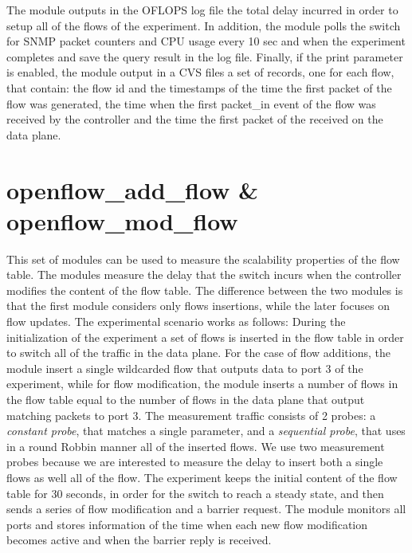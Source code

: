 \documentclass{book}
\begin{document}
  The module outputs in the OFLOPS log file the total delay incurred in order to
  setup all of the flows of the experiment. In addition, the module polls the 
  switch for SNMP packet counters and CPU usage every 10 sec and when the experiment 
  completes and save the query result in the log file. Finally, if the print 
  parameter is enabled, the module output in a CVS files a set of 
  records,  one for each flow, that contain: the flow id and the timestamps of the time the first
  packet of the flow was generated, the time when the first packet\_in event of
  the flow was received by the controller and the time the first packet of the
  received on the data plane. 

  \section{openflow\_add\_flow  \& openflow\_mod\_flow}

  This set of modules can be used to measure the scalability properties of the flow
  table. The modules measure the delay that the switch incurs when the controller
  modifies the content of the flow table. The difference between the two modules is that the first
  module considers only flows insertions, while the later focuses on flow updates.
  The experimental scenario works as follows: During the initialization of the
  experiment a set of flows is inserted in the flow table in order to switch all
  of the traffic in the data plane. For the case of flow additions, the module
  insert a single wildcarded flow that outputs data to port 3 of the 
  experiment, while for flow modification, the module inserts a number of flows in the flow
  table equal to the number of flows in the data plane that output matching
  packets to port 3. The measurement traffic consists of 2 probes: a \emph{constant probe}, that
  matches a single parameter, and a \emph{sequential probe}, that uses in a round
  Robbin manner all of the inserted flows. We use two measurement probes
  because we are interested to measure the delay to insert both a single flows as
  well all of the flow. The experiment keeps the initial content of the flow table 
  for 30 seconds, in order for the switch to reach a
  steady state, and then sends a series of flow modification and a barrier
  request. The module monitors all ports and stores information of the time 
  when each new flow modification becomes active and when the barrier reply is
  received. 
\end{document}
